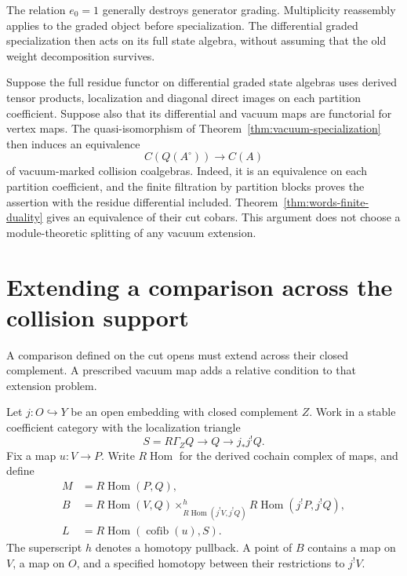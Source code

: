 The relation \(e_0=1\) generally destroys generator grading.
Multiplicity reassembly applies to the graded object before
specialization.  The differential graded specialization then
acts on its full state algebra, without assuming that the old
weight decomposition survives.

Suppose the full residue functor on differential graded state
algebras uses derived tensor products, localization and diagonal
direct images on each partition coefficient.  Suppose also that
its differential and vacuum maps are functorial for vertex maps.
The quasi-isomorphism of
Theorem~\ref{thm:vacuum-specialization} then induces an equivalence
\[
 C(Q(A^\circ))\longrightarrow C(A)
\]
of vacuum-marked collision coalgebras.  Indeed, it is an
equivalence on each partition coefficient, and the finite
filtration by partition blocks proves the assertion with the
residue differential included.  Theorem~\ref{thm:words-finite-duality}
gives an equivalence of their cut cobars.  This argument does
not choose a module-theoretic splitting of any vacuum extension.

\section{Extending a comparison across the collision support}

A comparison defined on the cut opens must extend across their
closed complement.  A prescribed vacuum map adds a relative
condition to that extension problem.

Let \(j:O\hookrightarrow Y\) be an open embedding with closed
complement \(Z\).  Work in a stable coefficient category with
the localization triangle
\[
 S=R\Gamma_ZQ\longrightarrow Q\longrightarrow j_*j^!Q.
\]
Fix a map \(u:V\to P\).  Write \(R\operatorname{Hom}\) for the
derived cochain complex of maps, and define
\begin{align*}
 M&=R\operatorname{Hom}(P,Q),\\
 B&=R\operatorname{Hom}(V,Q)
       \mathop{\times}^{h}_{R\operatorname{Hom}(j^!V,j^!Q)}
          R\operatorname{Hom}(j^!P,j^!Q),\\
 L&=R\operatorname{Hom}(\operatorname{cofib}(u),S).
\end{align*}
The superscript \(h\) denotes a homotopy pullback.  A point of
\(B\) contains a map on \(V\), a map on \(O\), and a specified
homotopy between their restrictions to \(j^!V\).


